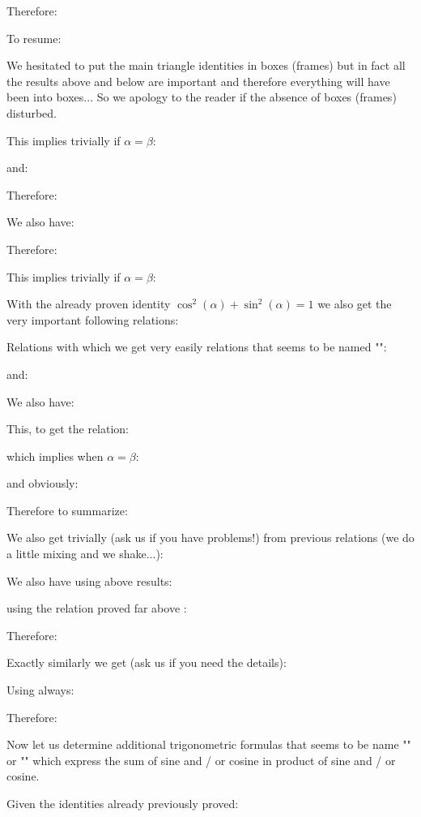 	Therefore:
	
	To resume:
	
	\begin{tcolorbox}[title=Remark,colframe=black,arc=10pt]
	We hesitated to put the main triangle identities in boxes (frames) but in fact all the results above and below are important and therefore everything will have been into boxes... So we apology to the reader if the absence of boxes (frames) disturbed.
	\end{tcolorbox}
	This implies trivially if $\alpha=\beta$:
	
	and:
	
	Therefore:
	
	We also have:
	
	Therefore:
	
	This implies trivially if $\alpha=\beta$:
	
	With the already proven identity $\cos^2(\alpha)+\sin^2(\alpha)=1$ we also get the very important following relations:
	
	Relations with which we get very easily relations that seems to be named "":
	
	and: 
	
	We also have:
	
	This, to get the relation:
	
	which implies when $\alpha=\beta$:
	
	and obviously:
	
	Therefore to summarize:
	
	We also get trivially (ask us if you have problems!) from previous relations (we do a little mixing and we shake...):
	
	We also have using above results:
	
	using the relation proved far above :
	
	Therefore:
	
	Exactly similarly we get (ask us if you need the details):
	
	Using always:
	
	Therefore:
	
	Now let us determine additional trigonometric formulas that seems to be name "" or "" which express the sum of sine and / or cosine in product of sine and / or cosine.
	
	Given the identities already previously proved:
	
